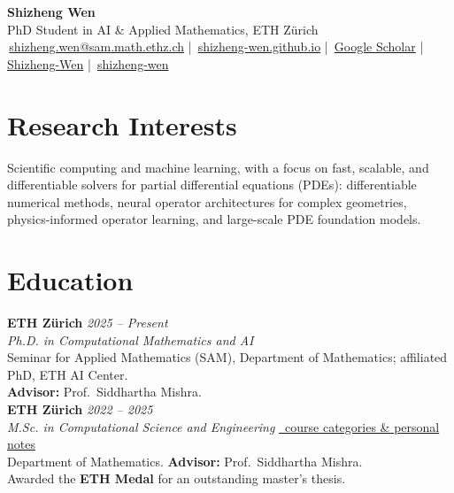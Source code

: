 \documentclass[10.5pt,a4paper]{article}
\newcommand{\cn}[1]{\begin{CJK}{UTF8}{gbsn}#1\end{CJK}}
\begin{document}
{\Huge\bfseries Shizheng Wen}\quad{\Large\color{muted}\cn{闻仕政}}\\[0.35em]
{\color{muted}\large PhD Student in AI \& Applied Mathematics, ETH Zürich}\\[0.7em]
{\small
\faEnvelope[regular]\,\href{mailto:shizheng.wen@sam.math.ethz.ch}{shizheng.wen@sam.math.ethz.ch}
\quad\textcolor{rule}{|}\quad
\faGlobe\,\href{https://shizheng-wen.github.io/}{shizheng-wen.github.io}
\quad\textcolor{rule}{|}\quad
\faGraduationCap\,\href{https://scholar.google.com/citations?user=PV4NVPgAAAAJ}{Google Scholar}
\quad\textcolor{rule}{|}\quad
\faGithub\,\href{https://github.com/Shizheng-Wen}{Shizheng-Wen}
\quad\textcolor{rule}{|}\quad
\faLinkedin\,\href{https://www.linkedin.com/in/shizheng-wen-1599b0184/}{shizheng-wen}
}

\section{Research Interests}
Scientific computing and machine learning, with a focus on fast, scalable, and differentiable
solvers for partial differential equations (PDEs): differentiable numerical methods, neural
operator architectures for complex geometries, physics-informed operator learning, and
large-scale PDE foundation models.

\section{Education}
\textbf{ETH Zürich} \hfill {\color{muted}\textit{2025 -- Present}}\\
\textit{Ph.D. in Computational Mathematics and AI}\\
{\color{muted}Seminar for Applied Mathematics (SAM), Department of Mathematics; affiliated PhD, ETH AI Center.\\
\textbf{Advisor:} Prof.\ Siddhartha Mishra.}\\[0.6em]

\textbf{ETH Zürich} \hfill {\color{muted}\textit{2022 -- 2025}}\\
\textit{M.Sc. in Computational Science and Engineering} \;\href{https://github.com/Shizheng-Wen/Note-Everyday}{\faGithub\ course categories \& personal notes}\\
{\color{muted}Department of Mathematics. \textbf{Advisor:} Prof.\ Siddhartha Mishra.\\
Awarded the {\color{ink}\textbf{ETH Medal}} for an outstanding master's thesis.}\\[0.6em]
\end{document}

